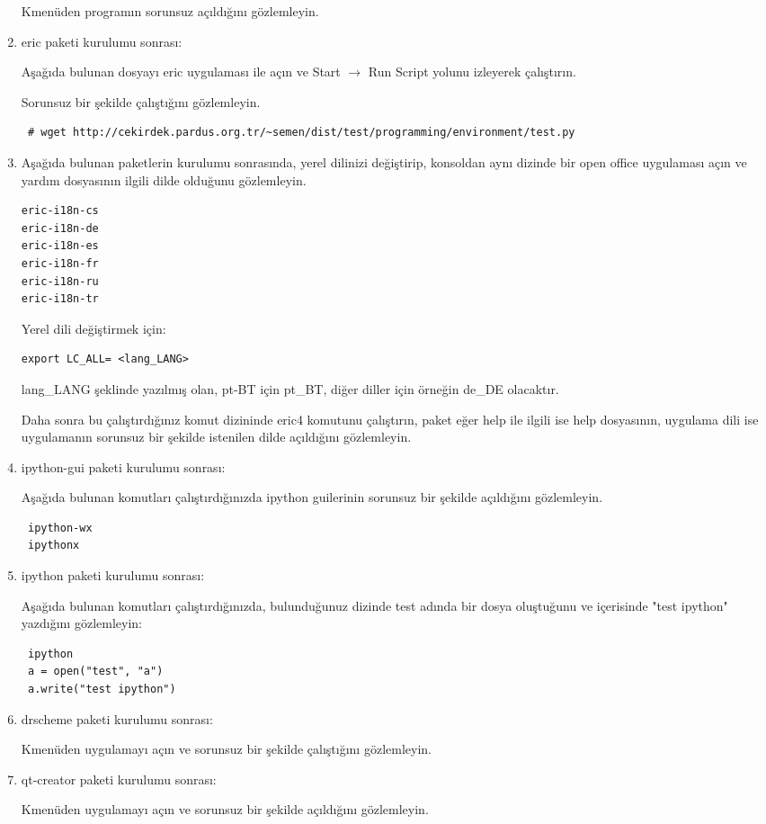 \documentclass[a4paper,10pt]{article}
\begin{document}
\begin{enumerate}
Kmenüden programın sorunsuz açıldığını gözlemleyin.

 \item eric paketi kurulumu sonrası:
 
Aşağıda bulunan dosyayı eric uygulaması ile açın ve Start $\rightarrow$ Run Script yolunu izleyerek çalıştırın. 

Sorunsuz bir şekilde çalıştığını gözlemleyin.
\begin{verbatim}
 # wget http://cekirdek.pardus.org.tr/~semen/dist/test/programming/environment/test.py
\end{verbatim}
 \item Aşağıda bulunan paketlerin kurulumu sonrasında, yerel dilinizi değiştirip, konsoldan aynı dizinde bir open office uygulaması açın ve yardım dosyasının ilgili dilde olduğunu gözlemleyin.
\begin{verbatim}
eric-i18n-cs
eric-i18n-de
eric-i18n-es
eric-i18n-fr
eric-i18n-ru
eric-i18n-tr
 \end{verbatim}

Yerel dili değiştirmek için:
\begin{verbatim}
export LC_ALL= <lang_LANG>
\end{verbatim}

lang\_LANG şeklinde yazılmış olan, pt-BT için pt\_BT, diğer diller için örneğin de\_DE olacaktır.

Daha sonra bu çalıştırdığınız komut dizininde eric4 komutunu çalıştırın, paket eğer help ile ilgili ise help dosyasının, uygulama dili ise uygulamanın sorunsuz bir şekilde istenilen dilde açıldığını gözlemleyin.

\item ipython-gui paketi kurulumu sonrası:

Aşağıda bulunan komutları çalıştırdığınızda ipython guilerinin sorunsuz bir şekilde açıldığını gözlemleyin.
\begin{verbatim}
 ipython-wx
 ipythonx
\end{verbatim}


\item ipython paketi kurulumu sonrası: 

Aşağıda bulunan komutları çalıştırdığınızda, bulunduğunuz dizinde test adında bir dosya oluştuğunu ve içerisinde "test ipython" yazdığını gözlemleyin:
\begin{verbatim}
 ipython
 a = open("test", "a")
 a.write("test ipython")
\end{verbatim}

\item drscheme paketi kurulumu sonrası:

Kmenüden uygulamayı açın ve sorunsuz bir şekilde çalıştığını gözlemleyin.

\item qt-creator paketi kurulumu sonrası:

Kmenüden uygulamayı açın ve sorunsuz bir şekilde açıldığını gözlemleyin.
\end{enumerate}
\end{document}
